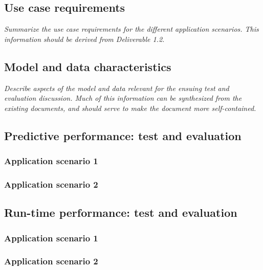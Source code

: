 \documentclass[11pt, oneside]{article}   	%
\numberwithin{figure}{section}
\numberwithin{equation}{section}
\numberwithin{table}{section}
\begin{document}
\subsection{Use case requirements}

\emph{Summarize the use case requirements for the different application scenarios. This information should be
  derived from Deliverable 1.2.}

\subsection{Model and data characteristics}

\emph{Describe aspects of the model and data relevant for the ensuing test and evaluation discussion. Much of
  this information can be synthesized from the existing documents, and should serve to make the document more
  self-contained. }




\subsection{Predictive performance: test and evaluation}

\subsubsection{Application scenario 1}

\subsubsection{Application scenario 2}

\subsection{Run-time performance: test and evaluation}

\subsubsection{Application scenario 1}

\subsubsection{Application scenario 2}





\end{document}
